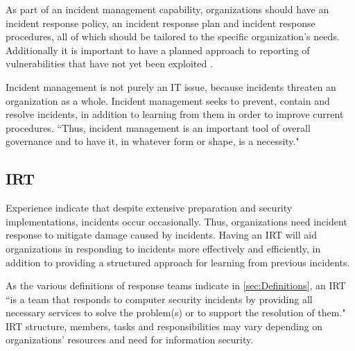 As part of an incident management capability, organizations should have an incident response policy, an incident response plan and incident response procedures, all of which should be tailored to the specific organization's needs. Additionally it is important to have a planned approach to reporting of vulnerabilities that have not yet been exploited \cite{ISO/IEC27035}.



Incident management is not purely an IT issue, because incidents threaten an organization as a whole. Incident management seeks to prevent, contain and resolve incidents, in addition to learning from them in order to improve current procedures. ``Thus, incident management is an important tool of overall governance and to have it, in whatever form or shape, is a necessity\cite{enisaGuide}." 

\subsection{\acl{IRT}}
Experience indicate that despite extensive preparation and security implementations, incidents occur occasionally. Thus, organizations need incident response to mitigate damage caused by incidents. Having an \ac{IRT} will aid organizations in responding to incidents more effectively and efficiently, in addition to providing a structured approach for learning from previous incidents. 

As the various definitions of response teams indicate in \ref{sec:Definitions}, an \ac{IRT} ``is a team that responds to computer security incidents by providing all necessary services to solve the problem(s) or to support the resolution of them\cite{enisaCSIRTGoodPractices}." \ac{IRT} structure, members, tasks and responsibilities may vary depending on organizations' resources and need for information security. 

